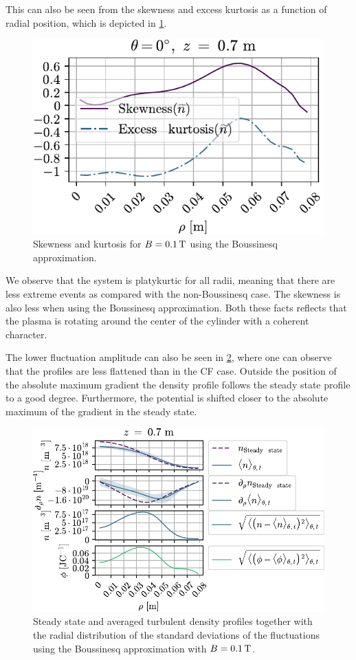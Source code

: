 This can also be seen from the skewness and excess kurtosis as a function of radial position, which is depicted in \cref{fig:skewKurt008B}.
%
\begin{figure}[htb]
    \centering
    \includegraphics{fig/results/compareBouss/skewKurt008B}
    \caption{Skewness and kurtosis for $B=0.1\, \text{T}$ using the Boussinesq approximation.}
    \label{fig:skewKurt008B}
\end{figure}
%
We observe that the system is platykurtic for all radii, meaning that there are less extreme events as compared with the non-Boussinesq case.
The skewness is also less when using the Boussinesq approximation.
Both these facts reflects that the plasma is rotating around the center of the cylinder with a coherent character.

The lower fluctuation amplitude can also be seen in \cref{fig:fluctProfiles01B}, where one can observe that the profiles are less flattened than in the CF case.
Outside the position of the absolute maximum gradient the density profile follows the steady state profile to a good degree.
Furthermore, the potential is shifted closer to the absolute maximum of the gradient in the steady state.
%
\begin{figure}[htb]
    \centering
    \includegraphics{fig/results/compareBouss/fluctProfiles01B}
    \caption{Steady state and averaged turbulent density profiles together with the radial distribution of the standard deviations of the fluctuations using the Boussinesq approximation with $B=0.1\, \text{T}$.}
    \label{fig:fluctProfiles01B}
\end{figure}
%
